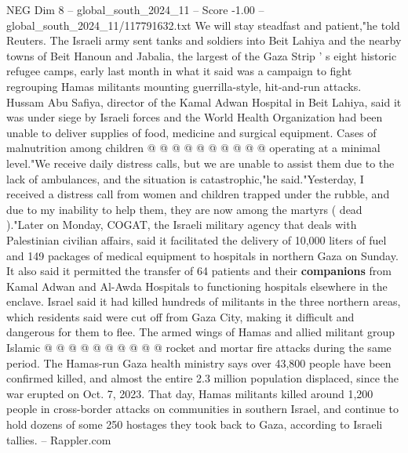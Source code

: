 \begin{textsample}{NEG Dim 8 – global\_south\_2024\_11 – Score -1.00 – global\_south\_2024\_11/117791632.txt}
We will stay steadfast and patient,"he told Reuters.
The Israeli army sent tanks and soldiers into Beit Lahiya and the nearby towns of Beit Hanoun and Jabalia, the largest of the Gaza Strip ' s eight historic refugee camps, early last month in what it said was a campaign to fight regrouping Hamas militants mounting guerrilla-style, hit-and-run attacks.
Hussam Abu Safiya, director of the Kamal Adwan Hospital in Beit Lahiya, said it was under siege by Israeli forces and the World Health Organization had been unable to deliver supplies of food, medicine and surgical equipment.
Cases of malnutrition among children @ @ @ @ @ @ @ @ @ @ operating at a minimal level."We receive daily distress calls, but we are unable to assist them due to the lack of ambulances, and the situation is catastrophic,"he said."Yesterday, I received a distress call from women and children trapped under the rubble, and due to my inability to help them, they are now among the martyrs ( dead )."Later on Monday, COGAT, the Israeli military agency that deals with Palestinian civilian affairs, said it facilitated the delivery of 10,000 liters of fuel and 149 packages of medical equipment to hospitals in northern Gaza on Sunday.
It also said it permitted the transfer of 64 patients and their \textbf{companions} from Kamal Adwan and Al-Awda Hospitals to functioning hospitals elsewhere in the enclave.
Israel said it had killed hundreds of militants in the three northern areas, which residents said were cut off from Gaza City, making it difficult and dangerous for them to flee.
The armed wings of Hamas and allied militant group Islamic @ @ @ @ @ @ @ @ @ @ rocket and mortar fire attacks during the same period.
The Hamas-run Gaza health ministry says over 43,800 people have been confirmed killed, and almost the entire 2.3 million population displaced, since the war erupted on Oct. 7, 2023.
That day, Hamas militants killed around 1,200 people in cross-border attacks on communities in southern Israel, and continue to hold dozens of some 250 hostages they took back to Gaza, according to Israeli tallies. -- Rappler.com

\end{textsample}
